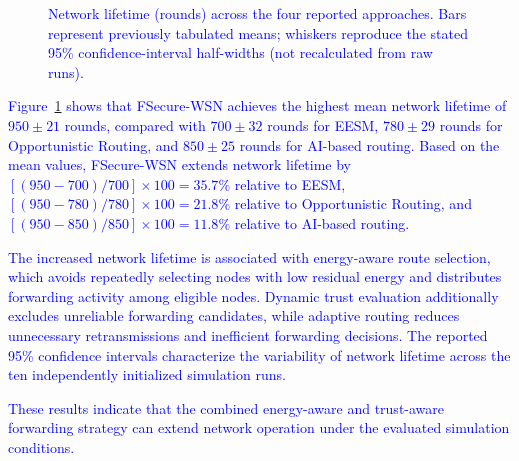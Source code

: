 \documentclass[pdflatex,sn-mathphys-num]{sn-jnl}
\newcommand{\Revised}[1]{\textcolor{blue}{#1}}
\begin{document}
\begin{figure}[!tb]
\centering
{}
\caption{\Revised{Network lifetime (rounds) across the four reported approaches. Bars represent previously tabulated means; whiskers reproduce the stated 95\% confidence-interval half-widths (not recalculated from raw runs).}}
\label{fig:lifetime}
\end{figure}

\textcolor{blue}{Figure~\ref{fig:lifetime} shows that FSecure-WSN achieves
the highest mean network lifetime of $950\pm21$ rounds, compared with
$700\pm32$ rounds for EESM, $780\pm29$ rounds for Opportunistic Routing, and
$850\pm25$ rounds for AI-based routing. Based on the mean values,
FSecure-WSN extends network lifetime by
$\left[(950-700)/700\right]\times100=35.7\%$ relative to EESM,
$\left[(950-780)/780\right]\times100=21.8\%$ relative to Opportunistic
Routing, and $\left[(950-850)/850\right]\times100=11.8\%$ relative to
AI-based routing.}

\textcolor{blue}{The increased network lifetime is associated with
energy-aware route selection, which avoids repeatedly selecting nodes with
low residual energy and distributes forwarding activity among eligible
nodes. Dynamic trust evaluation additionally excludes unreliable forwarding
candidates, while adaptive routing reduces unnecessary retransmissions and
inefficient forwarding decisions. The reported 95\% confidence intervals
characterize the variability of network lifetime across the ten independently
initialized simulation runs.}

\textcolor{blue}{These results indicate that the combined energy-aware and
trust-aware forwarding strategy can extend network operation under the
evaluated simulation conditions.}


\end{document}
